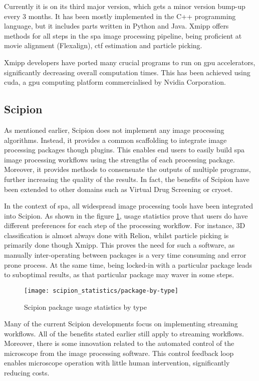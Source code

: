 \documentclass[../main.tex]{subfiles}
\begin{document}
Currently it is on its third major version, which gets a minor version bump-up every 3 months. It has been mostly implemented in the C++ programming language, but it includes parts written in Python and Java. Xmipp offers methods for all steps in the \gls{spa} image processing pipeline, being proficient at movie alignment (Flexalign)\cite{strelak2021}, \gls{ctf} estimation and particle picking.

Xmipp developers have ported many crucial programs to run on \gls{gpu} accelerators, significantly decreasing overall computation times. This has been achieved using \gls{cuda}, a \gls{gpu} computing platform commercialised by Nvidia Corporation.

\subsection{Scipion}
As mentioned earlier, Scipion does not implement any image processing algorithms. Instead, it provides a common scaffolding to integrate image processing packages though plugins. This enables end users to easily build \gls{spa} image processing workflows using the strengths of each processing package. Moreover, it provides methods to consensuate the outputs of multiple programs, further increasing the quality of the results. In fact, the benefits of Scipion have been extended to other domains such as Virtual Drug Screening\cite{scipion_chem} or \gls{cryoet}\cite{jimenezdelamorena2021}.

In the context of \gls{spa}, all widespread image processing tools have been integrated into Scipion. As shown in the figure \ref{fig:3:scipion_statistics_type}, usage statistics prove that users do have different preferences for each step of the processing workflow. For instance, 3D classification is almost always done with Relion, whilst particle picking is primarily done though Xmipp. This proves the need for such a software, as manually inter-operating between packages is a very time consuming and error prone process. At the same time, being locked-in with a particular package leads to suboptimal results, as that particular package may waver in some steps.

\begin{figure}[h]
    \centering
    \texttt{[image: scipion\_statistics/package-by-type]}
    \caption{Scipion package usage statistics by type}
    \label{fig:3:scipion_statistics_type}
\end{figure}

Many of the current Scipion developments focus on implementing streaming workflows. All of the benefits stated earlier still apply to streaming workflows. Moreover, there is some innovation related to the automated control of the microscope from the image processing software. This control feedback loop enables microscope operation with little human intervention, significantly reducing costs.
\end{document}
